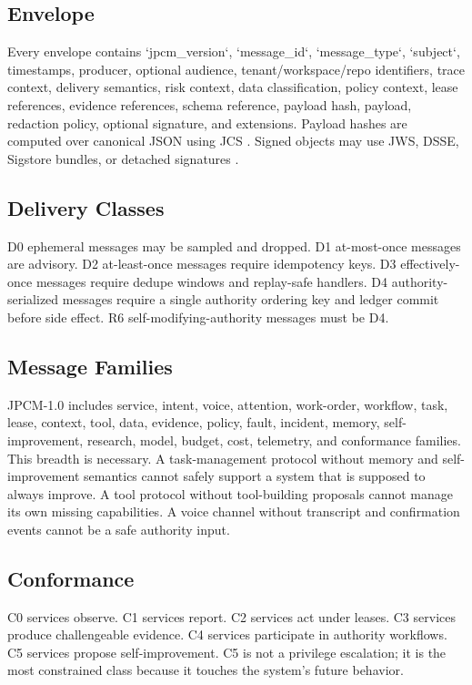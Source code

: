 \documentclass[journal,onecolumn]{IEEEtran}
\begin{document}
\subsection{Envelope}
Every envelope contains `jpcm\_version`, `message\_id`, `message\_type`, `subject`, timestamps, producer, optional audience, tenant/workspace/repo identifiers, trace context, delivery semantics, risk context, data classification, policy context, lease references, evidence references, schema reference, payload hash, payload, redaction policy, optional signature, and extensions. Payload hashes are computed over canonical JSON using JCS \cite{jcs}. Signed objects may use JWS, DSSE, Sigstore bundles, or detached signatures \cite{jws,dsse,sigstore}.

\subsection{Delivery Classes}
D0 ephemeral messages may be sampled and dropped. D1 at-most-once messages are advisory. D2 at-least-once messages require idempotency keys. D3 effectively-once messages require dedupe windows and replay-safe handlers. D4 authority-serialized messages require a single authority ordering key and ledger commit before side effect. R6 self-modifying-authority messages must be D4.

\subsection{Message Families}
JPCM-1.0 includes service, intent, voice, attention, work-order, workflow, task, lease, context, tool, data, evidence, policy, fault, incident, memory, self-improvement, research, model, budget, cost, telemetry, and conformance families. This breadth is necessary. A task-management protocol without memory and self-improvement semantics cannot safely support a system that is supposed to always improve. A tool protocol without tool-building proposals cannot manage its own missing capabilities. A voice channel without transcript and confirmation events cannot be a safe authority input.

\subsection{Conformance}
C0 services observe. C1 services report. C2 services act under leases. C3 services produce challengeable evidence. C4 services participate in authority workflows. C5 services propose self-improvement. C5 is not a privilege escalation; it is the most constrained class because it touches the system's future behavior.
\end{document}
